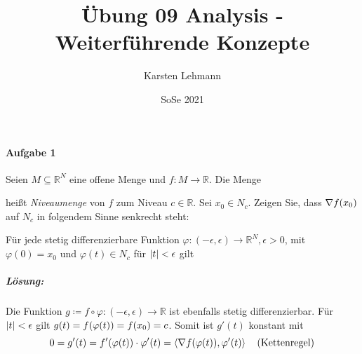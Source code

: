 \documentclass{scrreprt}
\author{Karsten Lehmann}
\date{SoSe 2021}
\title{Übung 09 Analysis - Weiterführende Konzepte}
\newcommand\skalprod[1]{\left\langle #1 \right\rangle}
\begin{document}
\paragraph{Aufgabe 1} Seien $M \subseteq \mathbb{R}^N$ eine offene Menge und
$f \colon M \to \mathbb{R}$.
Die Menge
heißt \textit{Niveaumenge} von $f$ zum Niveau $c \in \mathbb{R}$.
Sei $x_0 \in N_c$.
Zeigen Sie, dass $\nabla f\qty(x_0)$ auf $N_c$ in folgendem Sinne senkrecht
steht:

Für jede stetig differenzierbare Funktion
$\varphi \colon (-\epsilon, \epsilon) \to \mathbb{R}^N, \epsilon > 0$,
mit $\varphi(0) = x_0$ und $\varphi(t) \in N_c$ für $\abs{t} < \epsilon$
gilt

\subparagraph{Lösung:} Die Funktion
$g \coloneqq f \circ \varphi \colon (-\epsilon, \epsilon) \to \mathbb{R}$
ist ebenfalls stetig differenzierbar.
Für $\abs{t} < \epsilon$ gilt $g(t) = f(\varphi(t)) = f\qty(x_0) = c$.
Somit ist $g'(t)$ konstant mit
\[
  0 = g'(t) = f'\qty(\varphi(t)) \cdot \varphi'(t)
  = \skalprod{\nabla f(\varphi(t)), \varphi'(t)}
  \quad \text{(Kettenregel)}
\]
\end{document}
